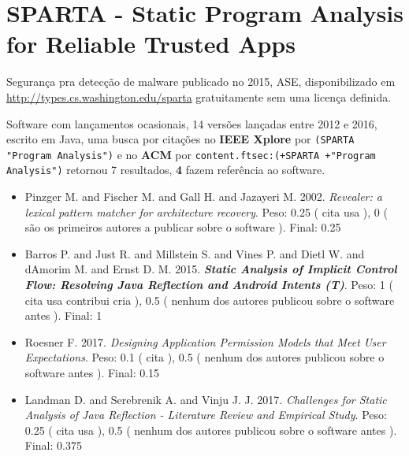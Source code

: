 \section{SPARTA - Static Program Analysis for Reliable Trusted Apps}

Segurança pra detecção de malware
publicado no 2015, ASE,
disponibilizado em \url{http://types.cs.washington.edu/sparta}
gratuitamente
sem uma licença definida.

Software com lançamentos ocasionais,
14 versões lançadas
entre 2012 e 2016,
escrito em Java,
uma busca por citações no {\bf IEEE Xplore} por
\texttt{(SPARTA "Program Analysis")}
e no {\bf ACM} por
\texttt{content.ftsec:(+SPARTA +"Program Analysis")}
retornou
7 resultados,
{\bf 4} fazem referência ao software.

\begin{itemize}
\item Pinzger M. and Fischer M. and Gall H. and Jazayeri M.
      2002.
        \textit{ Revealer: a lexical pattern matcher for architecture recovery}.
      Peso:
      0.25 (
          cita
          usa
      ),
      0 (
são os primeiros autores a publicar sobre o software
      ).
      Final:
      0.25

\item Barros P. and Just R. and Millstein S. and Vines P. and Dietl W. and dAmorim M. and Ernst D. M.
      2015.
        \textbf{\textit{ Static Analysis of Implicit Control Flow: Resolving Java Reflection and Android Intents (T)}}.
      Peso:
      1 (
          cita
          usa
          contribui
          cria
      ),
      0.5 (
nenhum dos autores publicou sobre o software antes
      ).
      Final:
      1

\item Roesner F.
      2017.
        \textit{ Designing Application Permission Models that Meet User Expectations}.
      Peso:
      0.1 (
          cita
      ),
      0.5 (
nenhum dos autores publicou sobre o software antes
      ).
      Final:
      0.15

\item Landman D. and Serebrenik A. and Vinju J. J.
      2017.
        \textit{ Challenges for Static Analysis of Java Reflection - Literature Review and Empirical Study}.
      Peso:
      0.25 (
          cita
          usa
      ),
      0.5 (
nenhum dos autores publicou sobre o software antes
      ).
      Final:
      0.375

\end{itemize}

